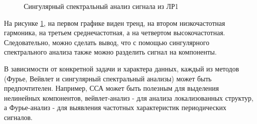 \documentclass[a4paper,oneside,14pt]{extreport}
\begin{document}
\begin{figure}[!h]
	\caption{Сингулярный спектральный анализ сигнала из ЛР1}
	\label{task3_ssa2}
\end{figure}

На рисунке \ref{task3_ssa2}, на первом графике виден тренд, на втором низкочастотная гармоника, на третьем среднечастотная, а на четвертом высокочастотная. Следовательно, можно сделать вывод, что с помощью сингулярного спектрального анализа также можно разделить сигнал на компоненты.

В зависимости от конкретной задачи и характера данных, каждый из методов (Фурье, Вейвлет и сингулярный спектральный анализы) может быть предпочтителен. Например, ССА может быть полезным для выделения нелинейных компонентов, вейвлет-анализ - для анализа локализованных структур, а Фурье-анализ - для выявления частотных характеристик периодических сигналов.
\end{document}
